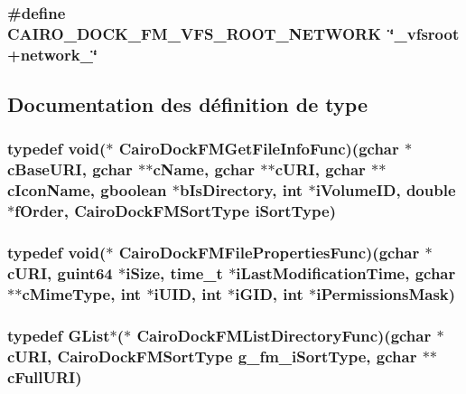 \subsubsection{\setlength{\rightskip}{0pt plus 5cm}\#define CAIRO\_\-DOCK\_\-FM\_\-VFS\_\-ROOT\_\-NETWORK~\char`\"{}\_\-vfsroot+network\_\-\char`\"{}}\label{cairo-dock-file-manager_8h_02585e5837f941bf3eb2934ed8620fd9}




\subsection{Documentation des définition de type}
\subsubsection{\setlength{\rightskip}{0pt plus 5cm}typedef void($\ast$ {\bf CairoDockFMGetFileInfoFunc})(gchar $\ast$cBaseURI, gchar $\ast$$\ast$cName, gchar $\ast$$\ast$cURI, gchar $\ast$$\ast$cIconName, gboolean $\ast$bIsDirectory, int $\ast$iVolumeID, double $\ast$fOrder, {\bf CairoDockFMSortType} iSortType)}\label{cairo-dock-file-manager_8h_95ea694838c301e495a6c3f9d91181f8}


\subsubsection{\setlength{\rightskip}{0pt plus 5cm}typedef void($\ast$ {\bf CairoDockFMFilePropertiesFunc})(gchar $\ast$cURI, guint64 $\ast$iSize, time\_\-t $\ast$iLastModificationTime, gchar $\ast$$\ast$cMimeType, int $\ast$iUID, int $\ast$iGID, int $\ast$iPermissionsMask)}\label{cairo-dock-file-manager_8h_3c0d31a846f93a603413f0d2c2e76aa8}


\subsubsection{\setlength{\rightskip}{0pt plus 5cm}typedef GList$\ast$($\ast$ {\bf CairoDockFMListDirectoryFunc})(gchar $\ast$cURI, {\bf CairoDockFMSortType} g\_\-fm\_\-iSortType, gchar $\ast$$\ast$cFullURI)}\label{cairo-dock-file-manager_8h_4901f5e53c1514142096a9b78ad952b8}


